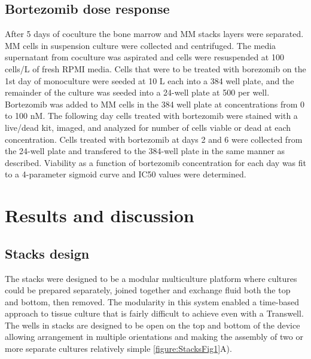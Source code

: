 \subsection{Bortezomib dose response}
After 5 days of coculture the bone marrow and MM stacks layers were separated. MM cells in suspension culture were collected and centrifuged. The media supernatant from coculture was aspirated and cells were resuspended at 100 cells/\textmu L of fresh RPMI media. Cells that were to be treated with borezomib on the 1st day of monoculture were seeded at 10 \textmu L each into a 384 well plate, and the remainder of the culture was seeded into a 24-well plate at 500 \textmu per well. Bortezomib was added to MM cells in the 384 well plate at concentrations from 0 to 100 nM. The following day cells treated with bortezomib were stained with a live/dead kit, imaged, and analyzed for number of cells viable or dead at each concentration. Cells treated with bortezomib at days 2 and 6 were collected from the 24-well plate and transfered to the 384-well plate in the same manner as described. Viability as a function of bortezomib concentration for each day was fit to a 4-parameter sigmoid curve and IC50 values were determined. 


\section{Results and discussion}

\subsection{Stacks design}

The stacks were designed to be a modular multiculture platform where cultures could be prepared separately, joined together and exchange fluid both the top and bottom, then removed. The modularity in this system enabled a time-based approach to tissue culture that is fairly difficult to achieve even with a Transwell. The wells in stacks are designed to be open on the top and bottom of the device allowing arrangement in multiple orientations and making the assembly of two or more separate cultures relatively simple \ref{figure:StacksFig1}A).

